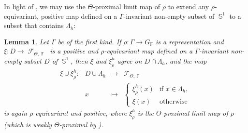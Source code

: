 \documentclass{amsart}
\theoremstyle{plain}
\newtheorem{lemma}[proposition]{Lemma}
\theoremstyle{definition}
\DeclareMathOperator{\Fc}{\mathcal{F}}
\DeclareMathOperator{\Fb}{{\mathbb{F}}}
\DeclareMathOperator{\Sb}{\mathbb{S}}
\newcommand*\from{\colon}
\newcommand{\1}{\mathbf{1}}
\begin{document}
In light of , we may use the $\Theta$-proximal limit map of $\rho$ to extend any $\rho$-equivariant, positive map defined on a $\Gamma$-invariant non-empty subset of $\Sb^1$ to a subset that contains $\Lambda_h$:

\begin{lemma}\label{corollary: limit map extends to proximal limit map}
    Let $\Gamma$ be of the first kind. If $\rho \colon\Gamma\to G_{\Fb}$ is a representation and $\xi \from D \to \Fc_{\Theta,\Fb}$ is a positive and $\rho$-equivariant map defined on a $\Gamma$-invariant non-empty subset $D$ of $\Sb^1$, then $\xi$ and $\xi^h_\rho$ agree on $D\cap\Lambda_h$, and the map
    \[\begin{array}{rccl}
    \xi \cup \xi^h_\rho \colon & D\cup \Lambda_h & \to  &\Fc_{\Theta,\Fb} \\
    & x & \mapsto & \begin{cases*} \xi^h_\rho(x) & \textrm{if $x\in \Lambda_h$}, \\ \xi(x) & \textrm{otherwise}\end{cases*}
    \end{array}\]
    is again $\rho$-equivariant and positive, where $\xi^h_\rho$ is the $\Theta$-proximal limit map of $\rho$ (which is weakly $\Theta$-proximal by ). 
\end{lemma}
\end{document}
